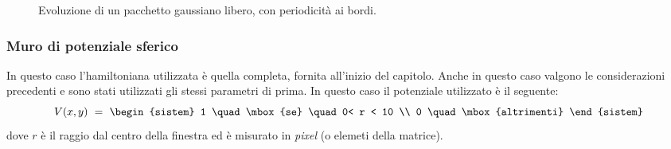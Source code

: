 \begin{figure}[hp]
    \caption{Evoluzione di un pacchetto gaussiano libero, con periodicità ai bordi.}
  \end{figure}
  \pagebreak
\subsubsection{Muro di potenziale sferico}
In questo caso l'hamiltoniana utilizzata è quella completa, fornita all'inizio del capitolo. Anche in questo caso valgono le considerazioni precedenti e sono stati utilizzati gli stessi parametri di prima.
In questo caso il potenziale utilizzato è il seguente:
$$
V(x,y) \ = \ \begin{sistem}
              1 \quad \mbox{se} \quad  0< r < 10 \\
              0 \quad \mbox{altrimenti}
             \end{sistem}
$$
dove $r$ è il raggio dal centro della finestra ed è misurato in \emph{pixel} (o elemeti della matrice).

